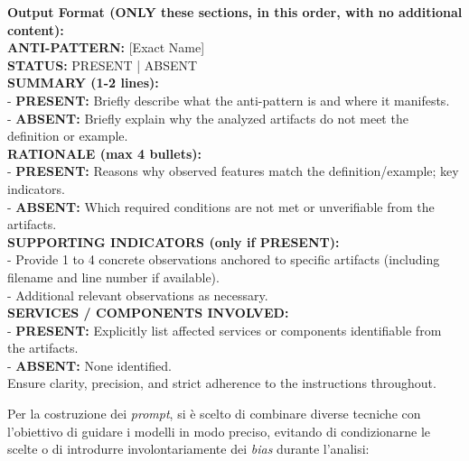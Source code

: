 \begin{mdframed}[linewidth=0.8pt, innermargin=10pt, outermargin=0pt]
\vspace{0.5em}
\textbf{Output Format (ONLY these sections, in this order, with no additional content):}\\

\textbf{ANTI-PATTERN:} [Exact Name]\\
\textbf{STATUS:} PRESENT | ABSENT\\

\vspace{0.5em}
\textbf{SUMMARY (1-2 lines):}\\
- \textbf{PRESENT:} Briefly describe what the anti-pattern is and where it manifests.\\
- \textbf{ABSENT:} Briefly explain why the analyzed artifacts do not meet the definition or example.\\

\vspace{0.5em}
\textbf{RATIONALE (max 4 bullets):}\\
- \textbf{PRESENT:} Reasons why observed features match the definition/example; key indicators.\\
- \textbf{ABSENT:} Which required conditions are not met or unverifiable from the artifacts.\\

\vspace{0.5em}
\textbf{SUPPORTING INDICATORS (only if PRESENT):}\\
- Provide 1 to 4 concrete observations anchored to specific artifacts (including filename and line number if available).\\
- Additional relevant observations as necessary.\\

\vspace{0.5em}
\textbf{SERVICES / COMPONENTS INVOLVED:}\\
- \textbf{PRESENT:} Explicitly list affected services or components identifiable from the artifacts.\\
- \textbf{ABSENT:} None identified.\\

\vspace{0.5em}
Ensure clarity, precision, and strict adherence to the instructions throughout.
\end{mdframed}
\vspace{1em}

\vspace{1em}

Per la costruzione dei \textit{prompt}, si è scelto di combinare diverse tecniche con l'obiettivo di guidare i modelli in modo preciso, evitando di condizionarne le scelte o di introdurre involontariamente dei \textit{bias} durante l'analisi:

